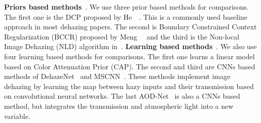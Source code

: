 \documentclass[10pt,twocolumn,letterpaper]{article}
\begin{document}
\vspace{-0.2cm}
{\flushleft \textbf{Priors based methods}}~\cite{he2011single,meng2013efficient,berman2016non}.
We use three prior based methods for comparisons. The first one is the DCP proposed by He~\etal~\cite{he2011singlecvpr,he2011single}. This is a commonly used baseline approach in most dehazing papers.
The second is Boundary Constrained Context Regularization (BCCR) proposed by Meng~\etal~\cite{meng2013efficient} and the third is the Non-local Image Dehazing (NLD) algorithm in~\cite{berman2016non}.
\vspace{-0.2cm}
{\flushleft \textbf{Learning based methods}}~\cite{zhu2015fast,cai2016dehazenet,ren2016single,li2017aod}.
We also use four learning based methods for comparisons.
The first one learns a linear model based on Color Attenuation Prior (CAP).
The second and third are CNNs based methods of DehazeNet~\cite{cai2016dehazenet} and MSCNN~\cite{ren2016single}.
These methods implement image dehazing by learning the map between hazy inputs and their transmission based on convolutional neural networks.
The last AOD-Net~\cite{li2017aod} is also a CNNs based method, but integrates the transmission and atmospheric light into a new variable.
\end{document}
